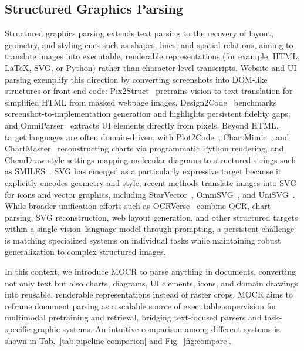 \documentclass{article}
\begin{document}
\subsection{Structured Graphics Parsing}
    Structured graphics parsing extends text parsing to the recovery of layout, geometry, and styling cues such as shapes, lines, and spatial relations, aiming to translate images into executable, renderable representations (for example, HTML, LaTeX, SVG, or Python) rather than character-level transcripts. Website and UI parsing exemplify this direction by converting screenshots into DOM-like structures or front-end code: Pix2Struct~\cite{lee2023pix2struct} pretrains vision-to-text translation for simplified HTML from masked webpage images, Design2Code~\cite{si2025design2code} benchmarks screenshot-to-implementation generation and highlights persistent fidelity gaps, and OmniParser~\cite{lu2024omniparser} extracts UI elements directly from pixels. Beyond HTML, target languages are often domain-driven, with Plot2Code~\cite{wu2025plot2code}, ChartMimic~\cite{yang2024chartmimic}, and ChartMaster~\cite{tan2025chartmaster} reconstructing charts via programmatic Python rendering, and ChemDraw-style settings mapping molecular diagrams to structured strings such as SMILES~\cite{zhao2025vincicoder}. SVG has emerged as a particularly expressive target because it explicitly encodes geometry and style; recent methods translate images into SVG for icons and vector graphics, including StarVector~\cite{rodriguez2025starvector}, OmniSVG~\cite{yang2025omnisvg}, and UniSVG~\cite{li2025unisvg}. While broader unification efforts such as OCRVerse~\cite{zhong2026ocrverse} combine OCR, chart parsing, SVG reconstruction, web layout generation, and other structured targets within a single vision–language model through prompting, a persistent challenge is matching specialized systems on individual tasks while maintaining robust generalization to complex structured images.

In this context, we introduce MOCR to parse anything in documents, converting not only text but also charts, diagrams, UI elements, icons, and domain drawings into reusable, renderable representations instead of raster crops. MOCR aims to reframe document parsing as a scalable source of executable supervision for multimodal pretraining and retrieval, bridging text-focused parsers and task-specific graphic systems. An intuitive comparison among different systems is shown in Tab.~\ref{tab:pipeline-comparion} and Fig.~\ref{fig:compare}.
\end{document}
